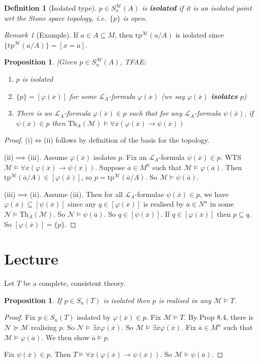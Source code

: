 \documentclass[]{article}
\theoremstyle{custhm}
\theoremstyle{cusdef}
\newtheorem{defin}[theorem]{Definition}
\theoremstyle{custhm}
\theoremstyle{custhm}
\theoremstyle{custhm}
\newtheorem{prop}[theorem]{Proposition}
\theoremstyle{ex}
\theoremstyle{custhm}
\theoremstyle{cusdef}
\theoremstyle{remark}
\newtheorem*{remark*}{Remark}
\theoremstyle{remark}
\theoremstyle{numremark}
\newcommand{\ra}{\rightarrow}
\newcommand{\ie}{\textit{i.e.}}
\newcommand{\undf}[1]{\textit{\textbf{#1}}}
\renewcommand{\L}{\mathcal{L}}
\newcommand{\M}{\mathcal{M}}
\renewcommand{\phi}{\varphi}
\renewcommand{\bar}{\overline}
\newcommand{\Th}{\textrm{Th}}
\newcommand{\tp}{\textrm{tp}}
\newcommand{\N}{\mathcal{N}}
\newcommand{\sman}{S_n^\M(A)}
\renewcommand{\subset}{\subseteq}
\begin{document}
\begin{defin}[Isolated type]
$p\in \sman$ is \undf{isolated} if it is an isolated point wrt the Stone space topology, \ie\ $\{p\}$ is open.
\end{defin}
\begin{remark*}[Example]
If $a\in A\subset M$, then $\tp^\M(a/A)$ is isolated since $\{\tp^\M(a/A)\} = [x = a]$.
\end{remark*}
\begin{prop}
|Given $p\in \sman$, TFAE:
\begin{enumerate}[label=\roman*)]
	\item $p$ is isolated
	\item $\{p\} = [\phi(\bar{x})]$ for some $\L_A$-formula $\phi(\bar{x})$ (we say $\phi(\bar{x})$ \undf{isolates} $p$)
	\item There is an $\L_A$-formula $\phi(\bar{x})\in p$ such that for any $\L_A$-formula $\psi(\bar{x})$, if $\psi(\bar{x})\in p$ then $\Th_A(\M)\models \forall \bar{x}(\phi(\bar{x})\ra\psi(\bar{x}))$
\end{enumerate}
\end{prop}
\begin{proof}
(i)$\iff$(ii) follows by definition of the basis for the topology.

(ii)$\implies$(iii). Assume $\phi(\bar{x})$ isolates $p$. Fix an $\L_A$-formula $\psi(\bar{x})\in p$. WTS $\M\models \forall \bar{x}(\phi(\bar{x})\ra\psi(\bar{x}))$. Suppose $\bar{a}\in M^n$ such that $\M\models \phi(\bar{a})$. Then $\tp^\M(\bar{a}/A)\in [\phi(\bar{x})]$, so $p = \tp^\M(\bar{a}/A)$. So $\M\models \psi(\bar{a})$.

(iii)$\implies$(ii). Assume (iii). Then for all $\L_A$-formulae $\psi(\bar{x})\in p$, we have $\phi(\bar{x})\subset[\psi(\bar{x})]$ since any $q \in [\phi(\bar{x})]$ is realised by $\bar{a} \in N^n$ in some $\N\models \Th_A(\M)$. So $\N\models \psi(\bar{a})$. So $q \in [\psi(\bar{x})]$. If $q \in [\phi(\bar{x})]$ then $p\subset q$. So $[\phi(\bar{x})] = \{p\}$.
\end{proof} 

\section{Lecture}

Let $T$ be a complete, consistent theory.

\begin{prop}
If $p \in S_n(T)$ is isolated then $p$ is realised in any $\M\models T$.
\end{prop}
\begin{proof}
Fix $p \in S_n(T)$ isolated by $\phi(\bar{x})\in p$. Fix $\M\models T$. By Prop 8.4, there is $\N\succeq \M$ realising $p$. So $\N\models \exists \bar{x}\phi(\bar{x})$. So $\M\models \exists \bar{x}\phi(\bar{x})$. Fix $\bar{a}\in M^n$ such that $\M\models \phi(\bar{a})$. We then show $\bar{a}\models p$.

Fix $\psi(\bar{x})\in p$. Then $T\models \forall \bar{x}(\phi(\bar{x})\ra\psi(\bar{x}))$. So $\M\models \psi(\bar{a})$.
\end{proof}
\end{document}
